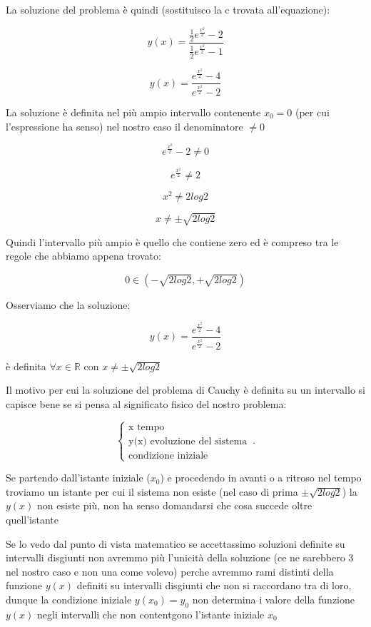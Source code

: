 \documentclass[11pt]{article}
\begin{document}
La soluzione del problema è quindi (sostituisco la c trovata all'equazione):

\[
    y(x) = \frac{\frac{1}{2} e ^{\frac{x ^{2}}{2} }-2}{\frac{1}{2} e ^{\frac{x ^{2}}{2} }-1} 
\]

\[
    y(x) = \frac{ e ^{\frac{x ^{2}}{2} }-4}{ e ^{\frac{x ^{2}}{2} }-2} 
\]

La soluzione è definita nel più ampio intervallo contenente $x_0 = 0 $ (per cui l'espressione ha senso) nel nostro caso il denominatore $\neq 0$

\[
    e ^{\frac{x ^{2}}{2} } - 2 \neq 0
\]

\[
    e ^{\frac{x ^{2}}{2} }  \neq 2
\]

\[
    x ^{2} \neq 2 log 2
\]

\[
    x \neq \pm \sqrt{2 log2}
\]

Quindi l'intervallo più ampio è quello che contiene zero ed è compreso tra le regole che abbiamo appena trovato:

\[
    0 \in (-\sqrt{2log2},+\sqrt{2log2}) 
\]

Osserviamo che la soluzione:

\[
    y(x) = \frac{ e ^{\frac{x ^{2}}{2} }-4}{ e ^{\frac{x ^{2}}{2} }-2} 
\]

è definita $\forall x \in \mathbb{R}$ con $x \neq \pm \sqrt{2log2}$


Il motivo per cui la soluzione del problema di Cauchy è definita su un intervallo si capisce bene se si pensa al significato fisico del nostro problema:

\begin{equation}
    \begin{cases}
        \text{x tempo}\\
        \text{y(x) evoluzione del sistema}\\
        \text{condizione iniziale}
    \end{cases}\,.
\end{equation}

Se partendo dall'istante iniziale ($x_0$) e procedendo in avanti o a ritroso nel tempo troviamo un istante per cui il sistema non esiste (nel caso di prima $\pm \sqrt{2log2}$) la $y(x)$ non esiste più, non ha senso domandarsi che cosa succede oltre quell'istante

Se lo vedo dal punto di vista matematico se accettassimo soluzioni definite su intervalli disgiunti non avremmo più l'unicità della soluzione (ce ne sarebbero 3 nel nostro caso e non una come volevo) perche avremmo rami distinti della funzione $y(x)$ definiti su intervalli disgiunti che non si raccordano tra di loro, dunque la condizione iniziale $y(x_0) = y_0$ non determina i valore della funzione $y(x)$ negli intervalli che non contentgono l'istante iniziale $x_0$
\end{document}
